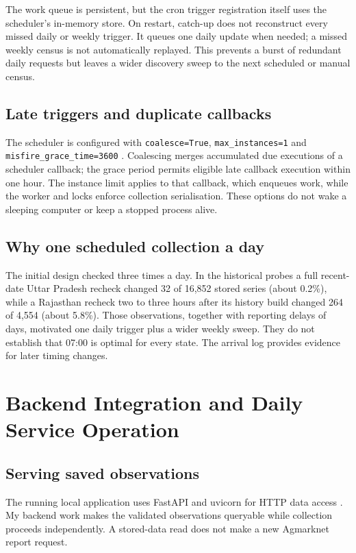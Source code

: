 \documentclass[12pt,a4paper,oneside]{report}
\numberwithin{equation}{chapter}
\numberwithin{figure}{chapter}
\numberwithin{table}{chapter}
\theoremstyle{definition}
\begin{document}
The work queue is persistent, but the cron trigger registration itself uses the scheduler's in-memory store. On restart, catch-up does not reconstruct every missed daily or weekly trigger. It queues one daily update when needed; a missed weekly census is not automatically replayed. This prevents a burst of redundant daily requests but leaves a wider discovery sweep to the next scheduled or manual census.

\section{Late triggers and duplicate callbacks}
The scheduler is configured with \texttt{coalesce=True}, \texttt{max\_instances=1} and \texttt{misfire\_grace\_time=3600} \cite{apscheduler}. Coalescing merges accumulated due executions of a scheduler callback; the grace period permits eligible late callback execution within one hour. The instance limit applies to that callback, which enqueues work, while the worker and locks enforce collection serialisation. These options do not wake a sleeping computer or keep a stopped process alive.

\section{Why one scheduled collection a day}
The initial design checked three times a day. In the historical probes a full recent-date Uttar Pradesh recheck changed 32 of 16,852 stored series (about 0.2\%), while a Rajasthan recheck two to three hours after its history build changed 264 of 4,554 (about 5.8\%). Those observations, together with reporting delays of days, motivated one daily trigger plus a wider weekly sweep. They do not establish that 07:00 is optimal for every state. The arrival log provides evidence for later timing changes.

\chapter{Backend Integration and Daily Service Operation}

\section{Serving saved observations}
The running local application uses FastAPI and uvicorn for HTTP data access \cite{fastapi}. My backend work makes the validated observations queryable while collection proceeds independently. A stored-data read does not make a new Agmarknet report request.
\end{document}
